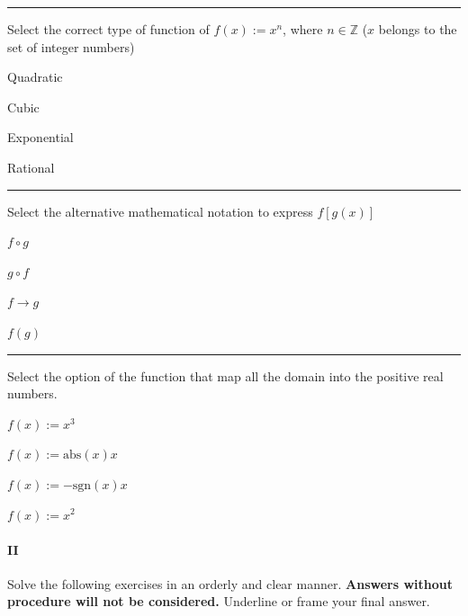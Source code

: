 \begin{preguntas}
\pregunta[5] \rule{1cm}{0.1mm} Select the correct type of function of $f(x):=x^n$, where $n\in\mathbb{Z}$ ($x$ belongs to the set of integer numbers)

\begin{enumerate*}[label=(\alph*)]
    \item Quadratic$\qquad$
    \item Cubic$\qquad$
    \item Exponential$\qquad$
    \item Rational$\qquad$
\end{enumerate*}

\pregunta[5] \rule{1cm}{0.1mm} Select the alternative mathematical notation to express $f[g(x)]$

\begin{enumerate*}[label=(\alph*)]
    \item $f\circ g\qquad$
    \item $g\circ f\qquad$
    \item $f\to g\qquad$
    \item $f(g)\qquad$
\end{enumerate*}

\pregunta[5] \rule{1cm}{0.1mm} Select the option of the function that map all the domain into the positive real numbers.

\begin{enumerate*}[label=(\alph*)]
    \item $f(x):=x^3\qquad$
    \item $f(x):=\mathrm{abs}(x)x\qquad$
    \item $f(x):=-\mathrm{sgn}(x) x\qquad$
    \item $f(x):=x^2\qquad$
\end{enumerate*}


\end{preguntas}

\newpage

\paragraph{II} Solve the following exercises in an orderly and clear manner. 
\textbf{Answers without procedure will not be considered.}
Underline or frame your final answer.

